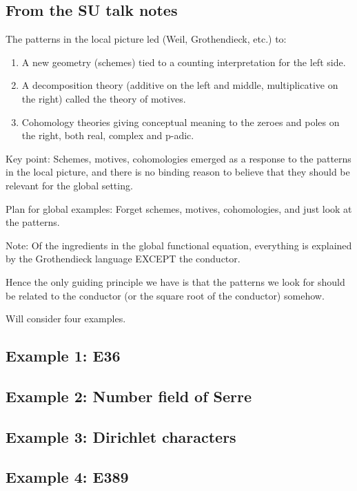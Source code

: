 \documentclass[paper=a4, fontsize=11pt]{scrartcl} %
\numberwithin{equation}{section} %
\numberwithin{figure}{section} %
\numberwithin{table}{section} %
\begin{document}
\subsection*{From the SU talk notes}


The patterns in the local picture led (Weil, Grothendieck, etc.) to:

\begin{enumerate}
\item A new geometry (schemes) tied to a counting interpretation for the left side.
\item A decomposition theory (additive on the left and middle, multiplicative on the right) called the theory of motives.
\item Cohomology theories giving conceptual meaning to the zeroes and poles on the right, both real, complex and p-adic.
\end{enumerate}

Key point: Schemes, motives, cohomologies emerged as a response to the patterns in the local picture, and there is no binding reason to believe that they should be relevant for the global setting.

Plan for global examples: Forget schemes, motives, cohomologies, and just look at the patterns.

Note: Of the ingredients in the global functional equation, everything is explained by the Grothendieck language EXCEPT the conductor.

Hence the only guiding principle we have is that the patterns we look for should be related to the conductor (or the square root of the conductor) somehow.

Will consider four examples.

\subsection{Example 1: E36}


\subsection{Example 2: Number field of Serre}


\subsection{Example 3: Dirichlet characters}


\subsection{Example 4: E389}
\end{document}
